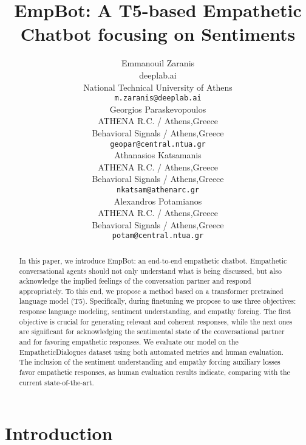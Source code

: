 \documentclass[11pt]{article}
\title{EmpBot: A T5-based Empathetic Chatbot focusing on Sentiments }
\author{Emmanouil Zaranis \\
  deeplab.ai \\
  National Technical University of Athens \\
  \texttt{m.zaranis@deeplab.ai} \\\And
Georgios Paraskevopoulos \\
  ATHENA R.C. / Athens,Greece \\
  Behavioral Signals / Athens,Greece\\
  \texttt{geopar@central.ntua.gr} \\\AND
  Athanasios Katsamanis \\
  ATHENA R.C. / Athens,Greece \\
  Behavioral Signals / Athens,Greece\\
  \texttt{nkatsam@athenarc.gr} \\\And
  Alexandros Potamianos \\
  ATHENA R.C. / Athens,Greece \\
  Behavioral Signals / Athens,Greece\\
  \texttt{potam@central.ntua.gr} \\}
\begin{document}
\maketitle
\begin{abstract}
In this paper, we introduce EmpBot: an end-to-end empathetic chatbot. Empathetic conversational agents should not only understand what is being discussed, but also  acknowledge the implied feelings of the conversation partner and respond appropriately. To this end, we propose a method based on a transformer pretrained language model (T5). Specifically, during finetuning we propose to use three objectives: response language modeling, sentiment understanding, and empathy forcing. The first objective is crucial for generating relevant and coherent responses, while the next ones are significant for acknowledging the sentimental state of the conversational partner and for favoring empathetic responses.  We evaluate our model on the EmpatheticDialogues dataset using both automated metrics and human evaluation. The inclusion of the sentiment understanding and empathy forcing auxiliary losses favor empathetic responses, as human evaluation results indicate, comparing with the current state-of-the-art.
\end{abstract}


\section{Introduction}\label{sec:RelatedWork}
\end{document}
